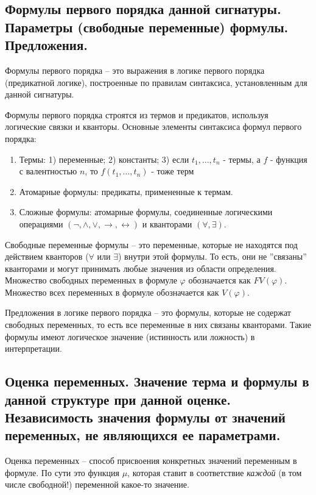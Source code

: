 \documentclass[a4paper, 10pt]{article}
\begin{document}
\subsection{Формулы первого порядка данной сигнатуры. Параметры (свободные переменные)
формулы. Предложения.}

Формулы первого порядка -- это выражения в логике первого порядка (предикатной логике), построенные по правилам синтаксиса, установленным для данной сигнатуры.

Формулы первого порядка строятся из термов и предикатов, используя логические связки и кванторы. Основные элементы синтаксиса формул первого порядка:
\begin{enumerate}
    \item Термы: 1) переменные; 2) константы; 3) если $t_1,\ldots,t_n$ - термы, а $f$ - функция с валентностью $n$, то $f(t_1,\ldots,t_n)$ - тоже терм
    \item Атомарные формулы: предикаты, примененные к термам.
    \item Сложные формулы: атомарные формулы, соединенные логическими операциями $(\lnot, \land, \lor, \to, \leftrightarrow)$ и кванторами $(\forall, \exists)$.
\end{enumerate}

Свободные переменные формулы -- это переменные, которые не находятся под действием кванторов ($\forall$ или $\exists$) внутри этой формулы. То есть, они не ''связаны'' кванторами и могут принимать любые значения из области определения. Множество свободных переменных в формуле $\varphi$ обозначается как $FV(\varphi)$. Множество всех переменных в формуле обозначается как $V(\varphi)$.

Предложения в логике первого порядка -- это формулы, которые не содержат свободных переменных, то есть все переменные в них связаны кванторами. Такие формулы имеют логическое значение (истинность или ложность) в интерпретации.

\subsection{Оценка переменных. Значение терма и формулы в данной структуре при данной оценке. Независимость значения формулы от значений переменных, не являющихся ее параметрами.}

Оценка переменных -- способ присвоения конкретных значений переменным в формуле. По сути это функция $\mu$, которая ставит в соответствие \textit{каждой} (в том числе свободной!) переменной какое-то значение.
\end{document}
